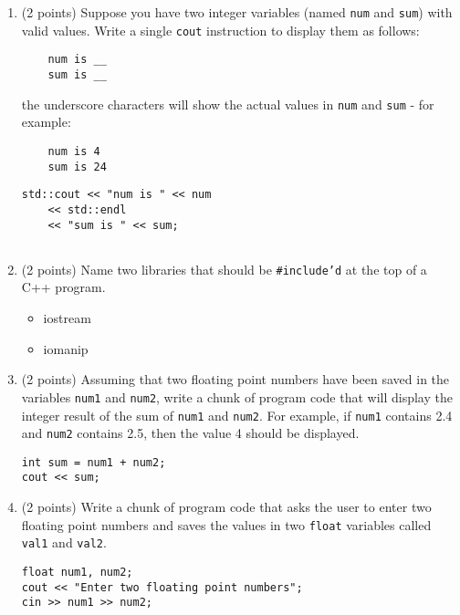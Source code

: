 \documentclass{report}
\begin{document}
\begin{enumerate}
    
    \item (2 points) Suppose you have two integer variables (named \texttt{num} and \texttt{sum}) with valid values. Write a single \texttt{cout} instruction to display them as follows:
    \begin{verbatim}
    num is __
    sum is __
    \end{verbatim}
    the underscore characters will show the actual values in \texttt{num} and \texttt{sum} - for example:
    \begin{verbatim}
    num is 4
    sum is 24
    \end{verbatim}
    \begin{verbatim}
std::cout << "num is " << num 
    << std::endl
    << "sum is " << sum;
        
    \end{verbatim}
    
    
    \item (2 points) Name two libraries that should be \texttt{\#include'd} at the top of a C++ program.
        \begin{itemize}
            \item iostream
            \item iomanip
        \end{itemize}
    
    \item (2 points) Assuming that two floating point numbers have been saved in the variables \texttt{num1} and \texttt{num2}, write a chunk of program code that will display the integer result of the sum of \texttt{num1} and \texttt{num2}. For example, if \texttt{num1} contains 2.4 and \texttt{num2} contains 2.5, then the value 4 should be displayed.
        \begin{verbatim}
int sum = num1 + num2;
cout << sum;
        \end{verbatim}
        
    
    \item (2 points) Write a chunk of program code that asks the user to enter two floating point numbers and saves the values in two \texttt{float} variables called \texttt{val1} and \texttt{val2}.
    \begin{verbatim}
float num1, num2;
cout << "Enter two floating point numbers";
cin >> num1 >> num2;
    \end{verbatim}
    \end{enumerate}

    \pagebreak \bigbreak \noindent 
\end{document}
